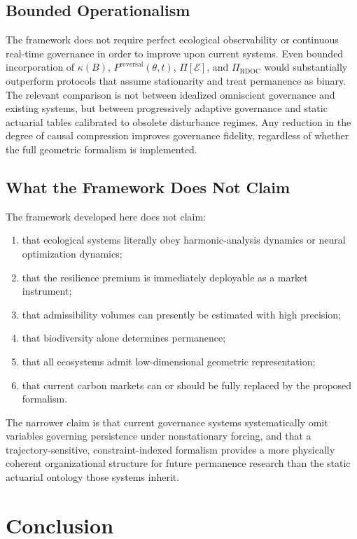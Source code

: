 \documentclass[12pt]{article}
\newcommand{\Ecal}{\mathcal{E}}
\begin{document}
\subsection{Bounded Operationalism}

The framework does not require perfect ecological observability or continuous real-time
governance in order to improve upon current systems. Even bounded incorporation of
$\kappa(B)$, $P^\text{reversal}(\theta,t)$, $\Pi[\Ecal]$, and $\Pi_\text{RDOC}$ would
substantially outperform protocols that assume stationarity and treat permanence as
binary. The relevant comparison is not between idealized omniscient governance and
existing systems, but between progressively adaptive governance and static actuarial
tables calibrated to obsolete disturbance regimes. Any reduction in the degree of causal
compression improves governance fidelity, regardless of whether the full geometric
formalism is implemented.

\subsection{What the Framework Does Not Claim}

The framework developed here does not claim:
\begin{enumerate}[leftmargin=*,label=(\roman*)]
\item that ecological systems literally obey harmonic-analysis dynamics or neural
      optimization dynamics;
\item that the resilience premium is immediately deployable as a market instrument;
\item that admissibility volumes can presently be estimated with high precision;
\item that biodiversity alone determines permanence;
\item that all ecosystems admit low-dimensional geometric representation;
\item that current carbon markets can or should be fully replaced by the proposed
      formalism.
\end{enumerate}

The narrower claim is that current governance systems systematically omit variables
governing persistence under nonstationary forcing, and that a trajectory-sensitive,
constraint-indexed formalism provides a more physically coherent organizational structure
for future permanence research than the static actuarial ontology those systems inherit.

\section{Conclusion}
\end{document}

